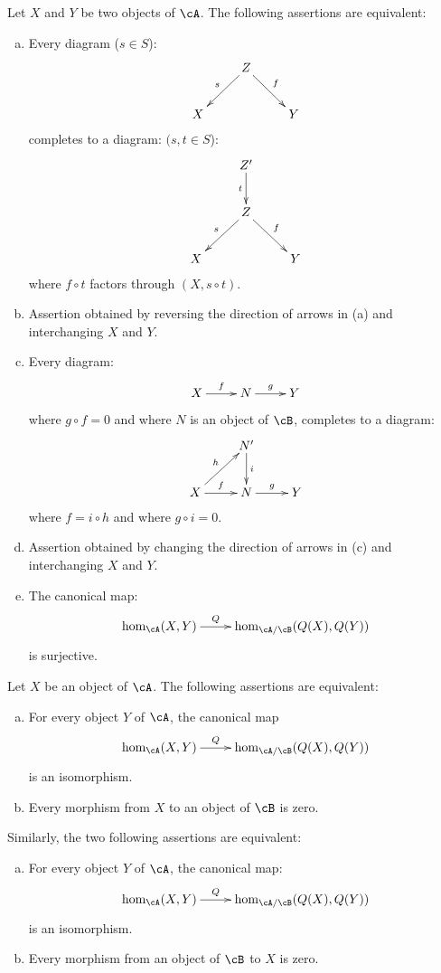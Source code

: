 \begin{proposition}\label{VIII:2-5-2}
Let $X$ and $Y$ be two objects of $\cA$. The following assertions are
equivalent:
\begin{enumerate}[(a)]
  \item Every diagram ($s\in S$): 
    \[\xymatrix{
      & Z \ar[dl]_-s \ar[dr]^-f \\
      X 
        & & Y 
    }\]
    completes to a diagram: $(s,t\in S$): 
    \[\xymatrix{
      & Z' \ar[d]_-t \\
      & Z \ar[dl]_-s \ar[dr]^-f \\
      X 
        & & Y 
    }\]
    where $f\circ t$ factors through $(X,s\circ t)$.
  \item Assertion obtained by reversing the direction of arrows in (a) and
    interchanging $X$ and $Y$.
  \item Every diagram: 
    \[\xymatrix{
      X \ar[r]^-f 
        & N \ar[r]^-g 
        & Y 
    }\]
    where $g\circ f=0$ and where $N$ is an object of $\cB$, completes to a
    diagram: 
    \[\xymatrix{
      & N' \ar[d]^-i \\
      X \ar[ur]^-h \ar[r]^-f 
        & N \ar[r]^-g 
        & Y 
    }\]
    where $f=i\circ h$ and where $g\circ i=0$.
  \item Assertion obtained by changing the direction of arrows in (c) and
    interchanging $X$ and $Y$.
  \item The canonical map: 
    \[\xymatrix{
      \hom_\cA(X,Y) \ar[r]^-Q 
        & \hom_{\cA/\cB}(Q(X),Q(Y)) 
    }\]
    is surjective.
\end{enumerate}
\end{proposition}





\begin{proposition}\label{VIII:2-5-3}
Let $X$ be an object of $\cA$. The following assertions are equivalent:
\begin{enumerate}[(a)]
  \item For every object $Y$ of $\cA$, the canonical map
    \[\xymatrix{
      \hom_\cA(X,Y) \ar[r]^-Q
        & \hom_{\cA/\cB}(Q(X),Q(Y))
    }\]
    is an isomorphism.
  \item Every morphism from $X$ to an object of $\cB$ is zero.
\end{enumerate}
Similarly, the two following assertions are equivalent:
\begin{enumerate}[(a)']
  \item For every object $Y$ of $\cA$, the canonical map:
    \[\xymatrix{
      \hom_\cA(X,Y) \ar[r]^-Q
        & \hom_{\cA/\cB}(Q(X),Q(Y))
    }\]
    is an isomorphism.
  \item Every morphism from an object of $\cB$ to $X$ is zero.
\end{enumerate}
\end{proposition}





